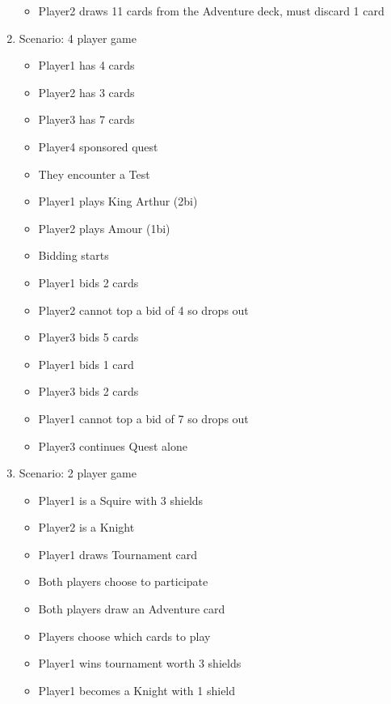 \documentclass[11pt]{article}
\begin{document}
\begin{enumerate}
\begin{itemize}
	\item Player2 draws 11 cards from the Adventure deck, must discard 1 card
	\end{itemize}
\item Scenario: 4 player game
	\begin{itemize}
	\item Player1 has 4 cards
	\item Player2 has 3 cards
	\item Player3 has 7 cards
	\item Player4 sponsored quest
	\item They encounter a Test
	\item Player1 plays King Arthur (2bi)
	\item Player2 plays Amour (1bi)
	\item Bidding starts
	\item Player1 bids 2 cards
	\item Player2 cannot top a bid of 4 so drops out
	\item Player3 bids 5 cards
	\item Player1 bids 1 card
	\item Player3 bids 2 cards
	\item Player1 cannot top a bid of 7 so drops out
	\item Player3 continues Quest alone
	\end{itemize}

\item Scenario: 2 player game
	\begin{itemize}
	\item Player1 is a Squire with 3 shields
	\item Player2 is a Knight
	\item Player1 draws Tournament card
	\item Both players choose to participate
	\item Both players draw an Adventure card
	\item Players choose which cards to play
	\item Player1 wins tournament worth 3 shields
	\item Player1 becomes a Knight with 1 shield
	\end{itemize}
\end{enumerate}
\end{document}
